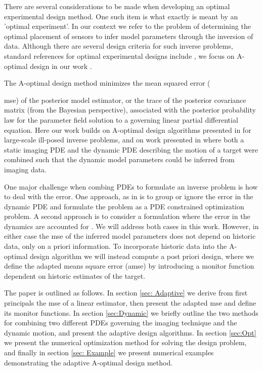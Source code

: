 \documentclass[english]{siamltex}
\begin{document}
There are several considerations to be made when developing an optimal experimental design method. One such item is what exactly is meant by an 'optimal experiment'. In our context we refer to the problem of determining  the optimal placement of sensors to infer model parameters  through the inversion of  data. 
 Although there are several design criteria for such inverse problems, standard references for optimal experimental designs include \cite{Standard refs}, we focus on A-optimal design in our work \cite{Bunch of design refs}. 
 
 The A-optimal design method minimizes the mean squared error ({mse) of the posterior model estimator, or the trace of the posterior covariance matrix (from the Bayesian perspective), associated with the posterior probability law for the parameter field solution to a governing linear partial differential equation. Here our work builds on A-optimal design algorithms presented in \cite{habera} for large-scale ill-posed inverse problems, and on work presented in \cite{fohring2014} where both a static imaging PDE and the dynamic PDE describing the motion of a target were combined such that the dynamic model parameters could be inferred from imaging data. 

One major challenge when combing PDEs to formulate an inverse problem is how to deal with the error. One approach, as in \cite{fohring2014} is to group or ignore the error in the dynamic PDE and formulate the problem as a PDE constrained optimization problem. A second approach is to consider a formulation where the error in the dynamics are accounted for  \cite{kalman, sasha's thesis or something}. We will address both cases in this work. However, in either case the mse of the inferred model parameters does not depend on historic data, only on a priori information. To incorporate historic data into the A-optimal design algorithm we will instead compute a post priori design, where we define the adapted means square error  (amse) by introducing a monitor function dependent on historic estimates of the  target. 
%


\bigskip
The paper is outlined as follows. In section \ref{sec: Adaptive} we derive from first principals the mse of a linear estimator, then present the adapted mse and define its monitor functions. In section \ref{sec:Dynamic} we briefly outline the two methods for combining two different PDEs governing the imaging technique and the dynamic motion, and present the adaptive design algorithms.  
In section \ref{sec:Opt} we present the numerical optimization method for solving the design problem, and finally in section \ref{sec: Example}  we present  numerical examples demonstrating the adaptive A-optimal design method. 




}
\end{document}
